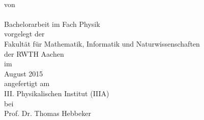 
\makeatletter
\begin{titlepage}
		\tgherosfont
		\centering
		
		\vspace*{\fill}
		
		{\Huge \color{ctcolormain}\textbf{\@title}} \\[8mm]
		
		\textsf{von} \\
		{\LARGE \@author} \\[48mm]
		
		\Large{Bachelorarbeit im Fach Physik} \\[16mm]
		
		\textsf{vorgelegt der} \\
		\Large{Fakultät für Mathematik, Informatik und Naturwissenschaften \\der RWTH Aachen} \\[8mm]
		
		\textsf{im} \\
		\Large{August 2015} \\[8mm]
		
		\textsf{angefertigt am} \\
		\Large{III. Physikalischen Institut (IIIA)} \\[8mm]
		
		\textsf{bei} \\
		\Large{Prof. Dr. Thomas Hebbeker} \\
\end{titlepage}
\makeatother